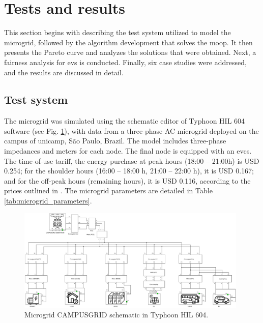 \documentclass[preprint, 12pt, 3p]{elsarticle}
\begin{document}
\section{Tests and results}\label{sec:tests_results}

This section begins with describing the test system utilized to model the microgrid, followed by the algorithm development that solves the \gls{moop}. It then presents the Pareto curve and analyzes the solutions that were obtained. Next, a fairness analysis for \glspl{ev} is conducted. Finally, six case studies were addressed, and the results are discussed in detail.

\subsection{Test system}\label{sec:case_study}

The microgrid was simulated using the schematic editor of
Typhoon HIL 604 software \cite{typhoonhil_software} (see Fig. \ref{fig:Microgrid_Schematic}), with data from a 
three-phase AC microgrid deployed on the campus of \gls{unicamp}, 
São Paulo, Brazil. The model includes three-phase impedances and meters for each node. The final node is equipped with an \gls{evcs}. 
The time-of-use tariff, the energy purchase at peak hours (18:00 – 21:00h) is USD 0.254; for the shoulder hours (16:00 – 18:00 h, 21:00 – 22:00 h), it is USD 0.167; and for the off-peak hours (remaining hours), it is USD 0.116, according to the prices outlined in \cite{aneel}. The
microgrid parameters are detailed in Table \ref{tab:microgrid_parameters}.

\begin{figure}[!t]
    \centering
    \includegraphics[width=0.98\textwidth]{Figures/schematic_HIL.pdf}
    \caption{Microgrid CAMPUSGRID schematic in Typhoon HIL 604.}
    \label{fig:Microgrid_Schematic}
\end{figure}
\end{document}

